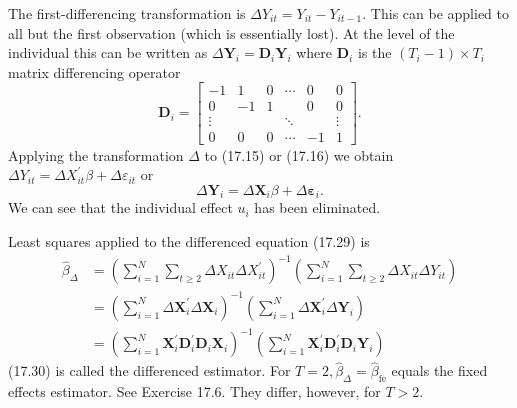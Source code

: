\documentclass[10pt]{article}
\begin{document}
The first-differencing transformation is $\Delta Y_{i t}=Y_{i t}-Y_{i t-1}$. This can be applied to all but the first observation (which is essentially lost). At the level of the individual this can be written as $\Delta \boldsymbol{Y}_{i}=\boldsymbol{D}_{i} \boldsymbol{Y}_{i}$ where $\boldsymbol{D}_{i}$ is the $\left(T_{i}-1\right) \times T_{i}$ matrix differencing operator
$$
\boldsymbol{D}_{i}=\left[\begin{array}{cccccc}
-1 & 1 & 0 & \cdots & 0 & 0 \\
0 & -1 & 1 & & 0 & 0 \\
\vdots & & & \ddots & & \vdots \\
0 & 0 & 0 & \cdots & -1 & 1
\end{array}\right] .
$$
Applying the transformation $\Delta$ to (17.15) or (17.16) we obtain $\Delta Y_{i t}=\Delta X_{i t}^{\prime} \beta+\Delta \varepsilon_{i t}$ or
$$
\Delta \boldsymbol{Y}_{i}=\Delta \boldsymbol{X}_{i} \beta+\Delta \boldsymbol{\varepsilon}_{i} .
$$
We can see that the individual effect $u_{i}$ has been eliminated.

Least squares applied to the differenced equation (17.29) is
$$
\begin{aligned}
\widehat{\beta}_{\Delta} &=\left(\sum_{i=1}^{N} \sum_{t \geq 2} \Delta X_{i t} \Delta X_{i t}^{\prime}\right)^{-1}\left(\sum_{i=1}^{N} \sum_{t \geq 2} \Delta X_{i t} \Delta Y_{i t}\right) \\
&=\left(\sum_{i=1}^{N} \Delta \boldsymbol{X}_{i}^{\prime} \Delta \boldsymbol{X}_{i}\right)^{-1}\left(\sum_{i=1}^{N} \Delta \boldsymbol{X}_{i}^{\prime} \Delta \boldsymbol{Y}_{i}\right) \\
&=\left(\sum_{i=1}^{N} \boldsymbol{X}_{i}^{\prime} \boldsymbol{D}_{i}^{\prime} \boldsymbol{D}_{i} \boldsymbol{X}_{i}\right)^{-1}\left(\sum_{i=1}^{N} \boldsymbol{X}_{i}^{\prime} \boldsymbol{D}_{i}^{\prime} \boldsymbol{D}_{i} \boldsymbol{Y}_{i}\right)
\end{aligned}
$$
(17.30) is called the differenced estimator. For $T=2, \widehat{\beta}_{\Delta}=\widehat{\beta}_{\mathrm{fe}}$ equals the fixed effects estimator. See Exercise 17.6. They differ, however, for $T>2$.
\end{document}
